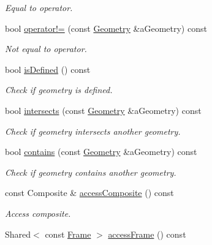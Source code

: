 \begin{DoxyCompactItemize}
\begin{DoxyCompactList}\small\item\em Equal to operator. \end{DoxyCompactList}\item 
bool \hyperlink{classlibrary_1_1physics_1_1env_1_1object_1_1_geometry_aab7132adf31bf6bd03dcdad46b767765}{operator!=} (const \hyperlink{classlibrary_1_1physics_1_1env_1_1object_1_1_geometry}{Geometry} \&a\+Geometry) const
\begin{DoxyCompactList}\small\item\em Not equal to operator. \end{DoxyCompactList}\item 
bool \hyperlink{classlibrary_1_1physics_1_1env_1_1object_1_1_geometry_a1db567a9a36c4b6878e2d59a633f5a38}{is\+Defined} () const
\begin{DoxyCompactList}\small\item\em Check if geometry is defined. \end{DoxyCompactList}\item 
bool \hyperlink{classlibrary_1_1physics_1_1env_1_1object_1_1_geometry_ac750e2584bc1564fbf1daf57a2231a5a}{intersects} (const \hyperlink{classlibrary_1_1physics_1_1env_1_1object_1_1_geometry}{Geometry} \&a\+Geometry) const
\begin{DoxyCompactList}\small\item\em Check if geometry intersects another geometry. \end{DoxyCompactList}\item 
bool \hyperlink{classlibrary_1_1physics_1_1env_1_1object_1_1_geometry_a9122be6cc4de97bb7aec4ad66bee823d}{contains} (const \hyperlink{classlibrary_1_1physics_1_1env_1_1object_1_1_geometry}{Geometry} \&a\+Geometry) const
\begin{DoxyCompactList}\small\item\em Check if geometry contains another geometry. \end{DoxyCompactList}\item 
const Composite \& \hyperlink{classlibrary_1_1physics_1_1env_1_1object_1_1_geometry_ac107f01b791d7844e434c553643dcdf3}{access\+Composite} () const
\begin{DoxyCompactList}\small\item\em Access composite. \end{DoxyCompactList}\item 
Shared$<$ const \hyperlink{classlibrary_1_1physics_1_1coord_1_1_frame}{Frame} $>$ \hyperlink{classlibrary_1_1physics_1_1env_1_1object_1_1_geometry_a1a0569b5cdfba033d355057e215e22b8}{access\+Frame} () const

\end{DoxyCompactItemize}
